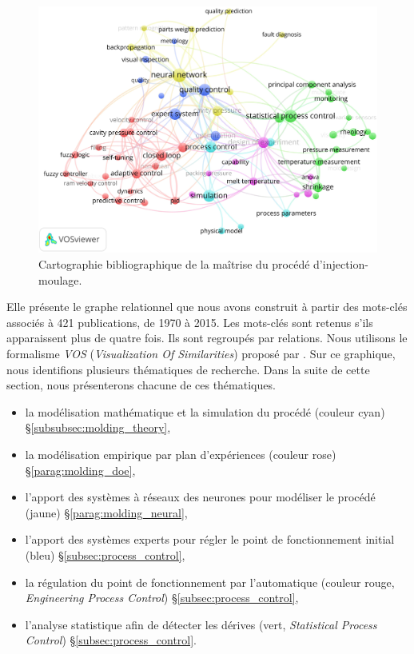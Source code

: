 \begin{figure}[bhtp]
	\centering
	\includegraphics[width=\textwidth,height=\textheight,keepaspectratio]{../Chap1/Figures/tagMapFinalPubliOccurence.jpg}
	\caption{Cartographie bibliographique de la maîtrise du procédé d'injection-moulage.}
	\label{fig:cartographie}
\end{figure}

Elle présente le graphe relationnel que nous avons construit à partir des mots-clés associés à 421 publications, de 1970 à 2015.
Les mots-clés sont retenus s’ils apparaissent plus de quatre fois.
Ils sont regroupés par relations.
Nous utilisons le formalisme \textit{VOS} (\textit{Visualization Of Similarities}) proposé par \citeauthor{vaneck_vos_2006} \cite{vaneck_vos_2006, van_eck_comparison_2010}.
Sur ce graphique, nous identifions plusieurs thématiques de recherche.
Dans la suite de cette section, nous présenterons chacune de ces thématiques.

\begin{itemize}
	\item la modélisation mathématique et la simulation du procédé (couleur cyan) §\ref{subsubsec:molding_theory},
	\item la modélisation empirique par plan d'expériences (couleur rose) §\ref{parag:molding_doe},
	\item l’apport des systèmes à réseaux des neurones pour modéliser le procédé (jaune) §\ref{parag:molding_neural},
	\item l’apport des systèmes experts pour régler le point de fonctionnement initial (bleu) §\ref{subsec:process_control},
	\item la régulation du point de fonctionnement par l'automatique (couleur rouge, \textit{Engineering Process Control}) §\ref{subsec:process_control},
	\item l’analyse statistique afin de détecter les dérives (vert, \textit{Statistical Process Control}) §\ref{subsec:process_control}.
\end{itemize}

